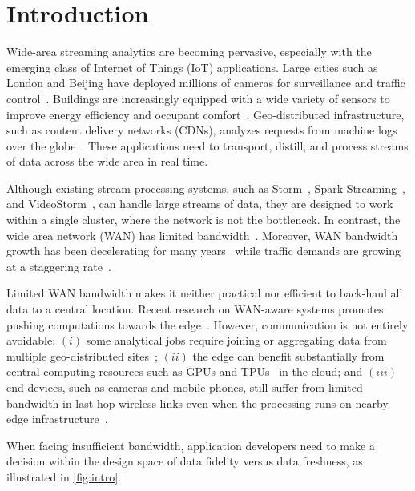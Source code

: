 \section{Introduction}

Wide-area streaming analytics are becoming pervasive, especially with the
emerging class of Internet of Things (IoT) applications.  Large cities such as
London and Beijing have deployed millions of cameras for surveillance and
traffic control~\cite{skynet, london.surveillance}. Buildings are increasingly
equipped with a wide variety of sensors to improve energy efficiency and
occupant comfort~\cite{krioukov2012building}. Geo-distributed infrastructure,
such as content delivery networks (CDNs), analyzes requests from machine logs
over the globe~\cite{mukerjee2015practical}. These applications need to
transport, distill, and process streams of data across the wide area in real
time.

Although existing stream processing systems, such as
Storm~\cite{toshniwal2014storm}, Spark Streaming~\cite{zaharia2013discretized},
and VideoStorm~\cite{zhang2017live}, can handle large streams of data, they are
designed to work within a single cluster, where the network is not the
bottleneck.  In contrast, the wide area network (WAN) has limited
bandwidth~\cite{hsieh17gaia, vulimiri2015global}.  Moreover, WAN bandwidth
growth has been decelerating for many years~\cite{global2016telegeography} while
traffic demands are growing at a staggering rate~\cite{index2013zettabyte}.

Limited WAN bandwidth makes it neither practical nor efficient to back-haul all
data to a central location.  Recent research on WAN-aware systems promotes
pushing computations towards the edge~\cite{rabkin2014aggregation,
  satyanarayanan2009case}. However, communication is not entirely avoidable:
$(i)$ some analytical jobs require joining or aggregating data from multiple
geo-distributed sites~\cite{pu2015low, viswanathan2016clarinet}; $(ii)$ the edge
can benefit substantially from central computing resources such as GPUs and
TPUs~\cite{abadi2016tensorflow} in the cloud; and $(iii)$ end devices, such as
cameras and mobile phones, still suffer from limited bandwidth in last-hop
wireless links even when the processing runs on nearby edge
infrastructure~\cite{abari2017enabling, zhang2015design}.

When facing insufficient bandwidth, application developers need to make a 
decision within the design space of data fidelity 
versus data freshness, as illustrated in \autoref{fig:intro}.


